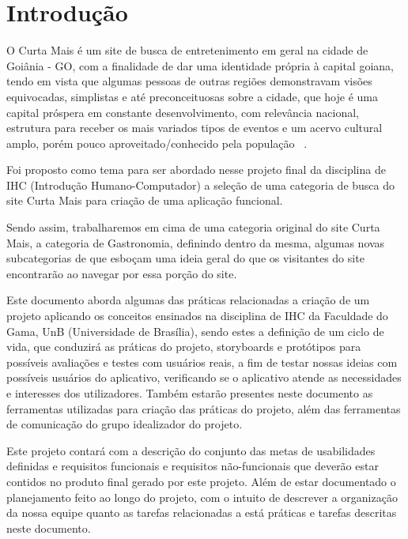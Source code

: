 \chapter[Introdução]{Introdução}

O Curta Mais é um site de busca de entretenimento em geral na cidade de Goiânia - GO, com a finalidade de dar uma identidade própria à capital goiana, tendo em vista  que algumas pessoas de outras regiões demonstravam visões equivocadas, simplistas e até preconceituosas sobre a cidade, que hoje é uma capital próspera em constante desenvolvimento, com relevância nacional, estrutura para receber os mais variados tipos de eventos e um acervo cultural amplo, porém pouco aproveitado/conhecido pela população ~\cite{curtamais}.

Foi proposto como tema para ser abordado nesse projeto final da disciplina de IHC (Introdução Humano-Computador) a seleção de uma categoria de busca do site Curta Mais para criação de uma aplicação funcional. 

Sendo assim, trabalharemos em cima de uma categoria original do site Curta Mais, a categoria de Gastronomia, definindo dentro da mesma, algumas novas subcategorias de que esboçam uma ideia geral do que os visitantes do site encontrarão ao navegar por essa porção do site. 

Este documento aborda algumas das práticas relacionadas a criação de um projeto aplicando os conceitos ensinados na disciplina de IHC da Faculdade do Gama, UnB (Universidade de Brasília), sendo estes a definição de um ciclo de vida, que conduzirá as práticas do projeto, storyboards e protótipos para possíveis avaliações e testes com usuários reais, a fim de testar nossas ideias com possíveis usuários do aplicativo, verificando se o aplicativo atende as necessidades e interesses dos utilizadores. Também estarão presentes neste documento as ferramentas utilizadas  para criação das práticas do projeto, além das ferramentas de comunicação do grupo idealizador do projeto.

Este projeto contará com a descrição do conjunto das metas de usabilidades definidas e requisitos funcionais e requisitos não-funcionais que deverão estar contidos no produto final gerado por este projeto. Além de estar documentado o planejamento feito ao longo do projeto, com o intuito de descrever a organização da nossa equipe quanto as tarefas relacionadas a está práticas e tarefas descritas neste documento.
